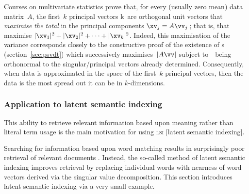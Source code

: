 Courses on multivariate statistics prove that, for every (usually zero mean) data matrix~\(A\), the first~\(k\) principal vectors \hlist\vv k\ are orthogonal unit vectors that \emph{maximise the total } in the principal components \(\xv_j=A\vv_j\)\,; that is, that maximise \(|\xv_1|^2+|\xv_2|^2+\cdots+|\xv_k|^2\).
Indeed, this maximisation of the variance corresponds closely to the constructive proof of the existence of \svd{}s (section~\ref{sec:psvdt}) which successively maximises~\(|A\vv|\) subject to~\vv\ being orthonormal to the singular\slash principal vectors already determined.
Consequently, when data is approximated in the space of the first~\(k\) principal vectors, then the data is the most spread out it can be in \(k\)-dimensions.







\subsubsection{Application to latent semantic indexing}
\label{sec:alsi}

\begin{quoted}{\cite[p.579]{Berry95}}
This ability to retrieve relevant information based upon meaning rather than literal term usage is the main motivation for using \textsc{lsi} [latent semantic indexing].
\end{quoted}

Searching for information based upon word matching results in surprisingly poor retrieval of relevant documents \cite[\S5.5]{Berry95}.
Instead, the so-called method of latent semantic indexing improves retrieval by replacing individual words with nearness of word vectors derived via the singular value decomposition.
This section introduces latent semantic indexing via a very small example. 


